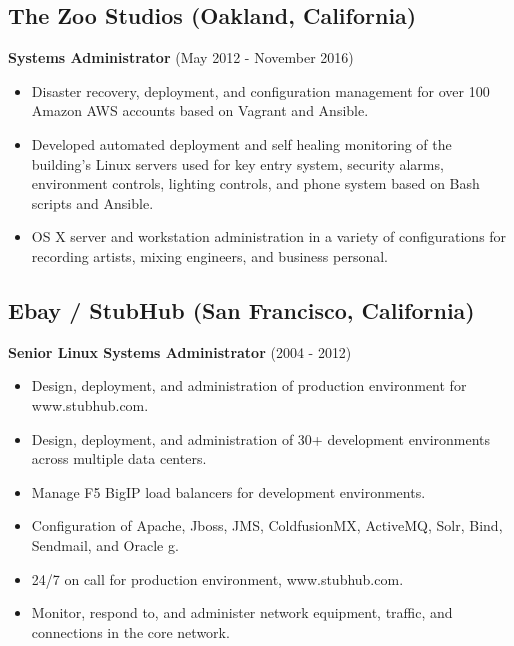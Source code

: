 \documentclass[]{article}
\providecommand{\tightlist}{%
  \setlength{\itemsep}{0pt}\setlength{\parskip}{0pt}}
\begin{document}
\subsection{The Zoo Studios (Oakland,
California)}\label{the-zoo-studios-oakland-california}

\textbf{Systems Administrator} (May 2012 - November 2016)

\begin{itemize}
\tightlist
\item
  Disaster recovery, deployment, and configuration management for over
  100 Amazon AWS accounts based on Vagrant and Ansible.
\item
  Developed automated deployment and self healing monitoring of the
  building's Linux servers used for key entry system, security alarms,
  environment controls, lighting controls, and phone system based on
  Bash scripts and Ansible.
\item
  OS X server and workstation administration in a variety of
  configurations for recording artists, mixing engineers, and business
  personal.
\end{itemize}

\subsection{Ebay / StubHub (San Francisco,
California)}\label{ebay-stubhub-san-francisco-california}

\textbf{Senior Linux Systems Administrator} (2004 - 2012)

\begin{itemize}
\tightlist
\item
  Design, deployment, and administration of production environment for
  www.stubhub.com.
\item
  Design, deployment, and administration of 30+ development environments
  across multiple data centers.
\item
  Manage F5 BigIP load balancers for development environments.
\item
  Configuration of Apache, Jboss, JMS, ColdfusionMX, ActiveMQ, Solr,
  Bind, Sendmail, and Oracle g.
\item
  24/7 on call for production environment, www.stubhub.com.
\item
  Monitor, respond to, and administer network equipment, traffic, and
  connections in the core network.
\end{itemize}
\end{document}
